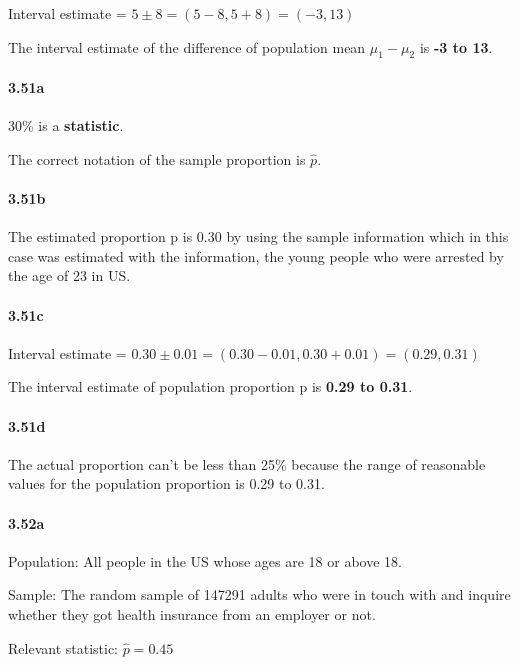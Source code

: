 \documentclass[
]{article}
\begin{document}
Interval estimate = \(5 \pm 8 = (5-8, 5+8) = (-3,13)\)

The interval estimate of the difference of population mean
\(\mu_1-\mu_2\) is \textbf{-3 to 13}.

\hypertarget{a-3}{%
\paragraph{3.51a}\label{a-3}}

30\% is a \textbf{statistic}.

The correct notation of the sample proportion is \(\hat{p}\).

\hypertarget{b-3}{%
\paragraph{3.51b}\label{b-3}}

The estimated proportion p is 0.30 by using the sample information which
in this case was estimated with the information, the young people who
were arrested by the age of 23 in US.

\hypertarget{c-2}{%
\paragraph{3.51c}\label{c-2}}

Interval estimate =
\(0.30 \pm 0.01 = (0.30-0.01, 0.30+0.01) = (0.29,0.31)\)

The interval estimate of population proportion p is \textbf{0.29 to
0.31}.

\hypertarget{d}{%
\paragraph{3.51d}\label{d}}

The actual proportion can't be less than 25\% because the range of
reasonable values for the population proportion is 0.29 to 0.31.

\hypertarget{a-4}{%
\paragraph{3.52a}\label{a-4}}

Population: All people in the US whose ages are 18 or above 18.

Sample: The random sample of 147291 adults who were in touch with and
inquire whether they got health insurance from an employer or not.

Relevant statistic: \(\hat{p}=0.45\)
\end{document}
